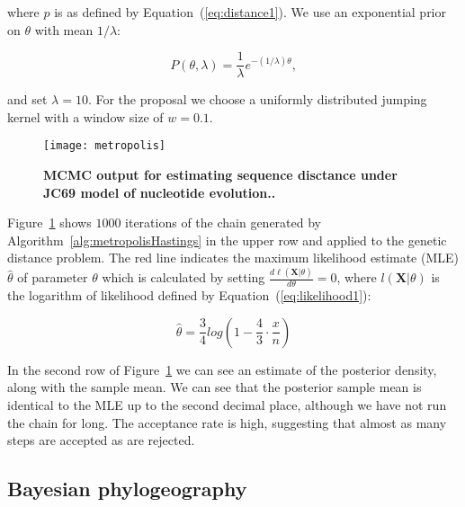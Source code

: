 \noindent
where $p$ is as defined by Equation~(\ref{eq:distance1}).
We use an exponential prior on $\theta$ with mean $1/\lambda$:

\begin{equation}
P\left(\theta,\lambda\right)=\frac{1}{\lambda}e^{-(1/\lambda)\theta},
\label{eq:expPrior}
\end{equation}

\noindent
and set $\lambda=10$.
For the proposal we choose a uniformly distributed jumping kernel with a window size of $w=0.1$.

\begin{figure}[H]
\centering
\texttt{[image: metropolis]} 
\caption{
{ \footnotesize 
{\bf MCMC output for estimating sequence disctance under JC69 model of nucleotide evolution..} 
}%
}
\label{fig:metropolis}
\end{figure}

Figure~\ref{fig:metropolis} shows $1000$ iterations of the chain generated by Algorithm~\ref{alg:metropolisHastings} in the upper row and applied to the genetic distance problem.
The red line indicates the maximum likelihood estimate (MLE) $\hat{\theta}$ of parameter $\theta$ which is calculated by setting $\frac{d\ell\left(\mathbf{X}|\theta\right)}{d\theta}=0$, where $l\left(\mathbf{X}|\theta\right)$ is the logarithm of likelihood defined by Equation~(\ref{eq:likelihood1}):

\begin{equation}
\hat{\theta}=\frac{3}{4}log\left(1-\frac{4}{3}\cdot\frac{x}{n}\right)
\label{eq:mle}
\end{equation}

In the second row of Figure~\ref{fig:metropolis} we can see an estimate of the posterior density, along with the sample mean.
We can see that the posterior sample mean is identical to the MLE up to the second decimal place, although we have not run the chain for long.
The acceptance rate is high, suggesting that almost as many steps are accepted as are rejected.

\subsection{Bayesian phylogeography}

